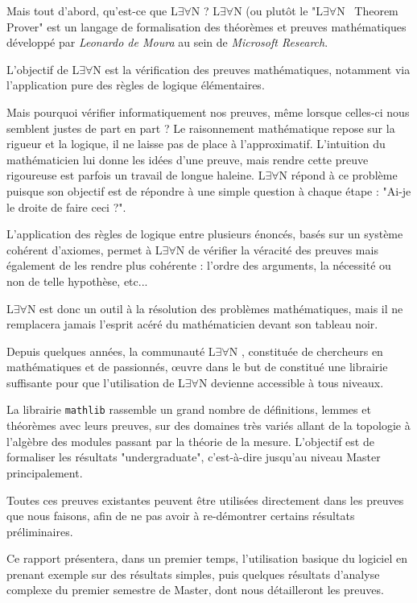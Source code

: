 \documentclass[a4paper, 11pt, twoside]{report}
\newcommand{\LEAN}{L$\exists\forall$N }
\begin{document}
Mais tout d'abord, qu'est-ce que \LEAN ? \LEAN (ou plutôt le "\LEAN\, Theorem Prover" est un langage de formalisation des théorèmes et preuves mathématiques développé par \textit{Leonardo de Moura} au sein de \textit{Microsoft Research}.

L'objectif de \LEAN est la vérification des preuves mathématiques, notamment via l'application pure des règles de logique élémentaires.

Mais pourquoi vérifier informatiquement nos preuves, même lorsque celles-ci nous semblent justes de part en part ? Le raisonnement mathématique repose sur la rigueur et la logique, il ne laisse pas de place à l'approximatif. L'intuition du mathématicien lui donne les idées d'une preuve, mais rendre cette preuve rigoureuse est parfois un travail de longue haleine. \LEAN répond à ce problème puisque son objectif est de répondre à une simple question à chaque étape : "Ai-je le droite de faire ceci ?".

L'application des règles de logique entre plusieurs énoncés, basés sur un système cohérent d'axiomes, permet à \LEAN de vérifier la véracité des preuves mais également de les rendre plus cohérente : l'ordre des arguments, la nécessité ou non de telle hypothèse, etc... 

\LEAN est donc un outil à la résolution des problèmes mathématiques, mais il ne remplacera jamais l'esprit acéré du mathématicien devant son tableau noir.

\medskip

Depuis quelques années, la communauté \LEAN, constituée de chercheurs en mathématiques et de passionnés, œuvre dans le but de constitué une librairie suffisante pour que l'utilisation de \LEAN devienne accessible à tous niveaux.

La librairie \verb|mathlib| rassemble un grand nombre de définitions, lemmes et théorèmes avec leurs preuves, sur des domaines très variés allant de la topologie à l'algèbre des modules passant par la théorie de la mesure. L'objectif est de formaliser les résultats "undergraduate", c'est-à-dire jusqu'au niveau Master principalement. 

Toutes ces preuves existantes peuvent être utilisées directement dans les preuves que nous faisons, afin de ne pas avoir à re-démontrer certains résultats préliminaires.

\bigskip

Ce rapport présentera, dans un premier temps, l'utilisation basique du logiciel en prenant exemple sur des résultats simples, puis quelques résultats d'analyse complexe du premier semestre de Master, dont nous détailleront les preuves.
\end{document}

